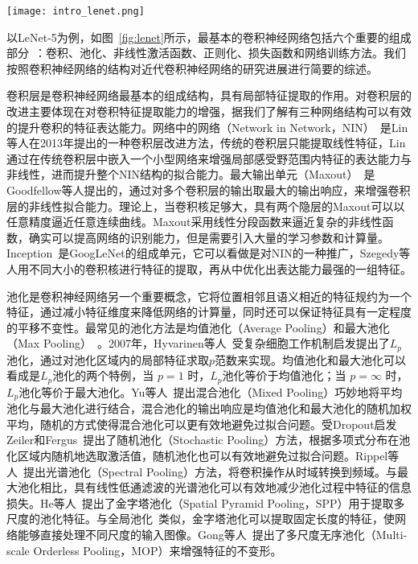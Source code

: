 \begin{figure*}
\centering
\texttt{[image: intro\_lenet.png]}
\caption{LeNet-5~\cite{lecun1989backpropagation}网络结构。}
\label{fig:lenet}
\end{figure*}

以LeNet-5为例，如图~\ref{fig:lenet}所示，最基本的卷积神经网络包括六个重要的组成部分~\cite{gu2015recent,bengio2013representation,bengio2009learning,lecun2010convolutional,schmidhuber2015deep,Goodfellow-et-al-2016-Book}：卷积、池化、非线性激活函数、正则化、损失函数和网络训练方法。我们按照卷积神经网络的结构对近代卷积神经网络的研究进展进行简要的综述。

卷积层是卷积神经网络最基本的组成结构，具有局部特征提取的作用。对卷积层的改进主要体现在对卷积特征提取能力的增强，据我们了解有三种网络结构可以有效的提升卷积的特征表达能力。网络中的网络（Network in Network，NIN）~\cite{DBLP:journals/corr/LinCY13}是Lin等人在2013年提出的一种卷积层改进方法，传统的卷积层只能提取线性特征，Lin通过在传统卷积层中嵌入一个小型网络来增强局部感受野范围内特征的表达能力与非线性，进而提升整个NIN结构的拟合能力。最大输出单元（Maxout）~\cite{goodfellow2013maxout}是Goodfellow等人提出的，通过对多个卷积层的输出取最大的输出响应，来增强卷积层的非线性拟合能力。理论上，当卷积核足够大，具有两个隐层的Maxout可以以任意精度逼近任意连续曲线。Maxout采用线性分段函数来逼近复杂的非线性函数，确实可以提高网络的识别能力，但是需要引入大量的学习参数和计算量。Inception~\cite{szegedy2014going,szegedy2015rethinking,szegedy2016inception}是GoogLeNet的组成单元，它可以看做是对NIN的一种推广，Szegedy等人用不同大小的卷积核进行特征的提取，再从中优化出表达能力最强的一组特征。

池化是卷积神经网络另一个重要概念，它将位置相邻且语义相近的特征规约为一个特征，通过减小特征维度来降低网络的计算量，同时还可以保证特征具有一定程度的平移不变性。最常见的池化方法是均值池化（Average Pooling）和最大池化（Max Pooling）~\cite{weng1992cresceptron}。2007年，Hyvarinen等人~\cite{hyvarinen2007complex,bruna2013signal}受复杂细胞工作机制启发提出了$L_{p}$池化，通过对池化区域内的局部特征求取$p$范数来实现。均值池化和最大池化可以看成是$L_{p}$池化的两个特例，当 $p=1$ 时，$L_{p}$池化等价于均值池化；当 $p=\infty$ 时， $L_{p}$池化等价于最大池化。Yu等人~\cite{yu2014mixed}提出混合池化（Mixed Pooling）巧妙地将平均池化与最大池化进行结合，混合池化的输出响应是均值池化和最大池化的随机加权平均，随机的方式使得混合池化可以更有效地避免过拟合问题。受Dropout启发Zeiler和Fergus~\cite{zeiler2013stochastic}提出了随机池化（Stochastic Pooling）方法，根据多项式分布在池化区域内随机地选取激活值，随机池化也可以有效地避免过拟合问题。Rippel等人~\cite{rippel2015spectral}提出光谱池化（Spectral Pooling）方法，将卷积操作从时域转换到频域。与最大池化相比，具有线性低通滤波的光谱池化可以有效地减少池化过程中特征的信息损失。He等人~\cite{he2014spatial}提出了金字塔池化（Spatial Pyramid Pooling，SPP）用于提取多尺度的池化特征。与全局池化~\cite{DBLP:journals/corr/LinCY13}类似，金字塔池化可以提取固定长度的特征，使网络能够直接处理不同尺度的输入图像。Gong等人~\cite{gong2014multi}提出了多尺度无序池化（Multi-scale Orderless Pooling，MOP）来增强特征的不变形。

